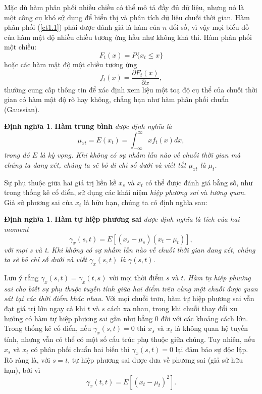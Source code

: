 \documentclass[12pt, a4paper,oneside]{book}
\theoremstyle{definition}
\newtheorem{dn}[theo]{Định nghĩa}
\begin{document}
Mặc dù hàm phân phối nhiều chiều có thể mô tả đầy đủ dữ liệu, nhưng nó là một công cụ khó sử dụng để hiển thị và phân tích dữ liệu chuỗi thời gian. Hàm phân phối (\ref{ct1.1}) phải được đánh giá là hàm của $n$ đối số, vì vậy mọi biểu đồ của hàm mật độ nhiều chiều tương ứng hầu như không khả thi. Hàm phân phối một chiều:
\begin{equation}
{F}_{t}(x)= {P}\{x_{t}\leq x\} \label{ct1.4}
\end{equation}
hoặc các hàm mật độ một chiều tương ứng 
\begin{equation}
{f}_{t}(x)= \dfrac{\partial{F}_{t}(x)}{\partial x}, \label{ct1.5}
\end{equation}
thường cung cấp thông tin để xác định xem liệu một toạ độ cụ thể của chuỗi thời gian có hàm mật độ rõ hay không, chẳng hạn như hàm phân phối chuẩn (Gaussian).
\begin{dn}\cite{8} \textbf{Hàm trung bình} \textit{được định nghĩa là
\begin{equation}
\mu_{xt} = E(x_{t}) =  \int_{-\infty}^{\infty} xf_{t}(x) dx, \label{ct1.6}
\end{equation}
trong đó $E$ là kỳ vọng. Khi không có sự nhầm lẫn nào về chuỗi thời gian mà chúng ta đang xét, chúng ta sẽ bỏ đi chỉ số dưới và viết tắt $\mu_{xt}$ là $\mu_{t}$.}
\end{dn}

Sự phụ thuộc giữa hai giá trị liền kề $x_{s}$ và $x_{t}$ có thể được đánh giá bằng số, như trong thống kê cổ điển, sử dụng các khái niệm \textit{hiệp phương sai} và \textit{tương quan}. Giả sử phương sai của $x_{t}$ là hữu hạn, chúng ta có định nghĩa sau:
\begin{dn}\cite{8} \textbf{Hàm tự hiệp phương sai} \textit{được định nghĩa là tích của hai moment
\begin{equation}
\gamma_{x}(s,t) =E[(x_{s}-\mu_{s})(x_{t}-\mu_{t})], \label{ct1.11}
\end{equation}
với mọi s và t. Khi không có sự nhầm lẫn nào về chuỗi thời gian đang xét, chúng ta sẽ bỏ chỉ số dưới và viết $\gamma_{x}(s,t)$ là $ \gamma(s,t).$}
\end{dn}

Lưu ý rằng $\gamma_{x}(s,t) =\gamma_{x}(t,s)$ với mọi thời điểm $s$ và $t$. \textit{Hàm tự hiệp phương sai cho biết sự phụ thuộc tuyến tính giữa hai điểm trên cùng một chuỗi được quan sát tại các thời điểm khác nhau}. Với mọi chuỗi trơn, hàm tự hiệp phương sai vẫn đạt giá trị lớn ngay cả khi $t$ và $s$ cách xa nhau, trong khi chuỗi thay đổi xu hướng có hàm tự hiệp phương sai  gần như bằng 0 đối với các khoảng cách lớn. Trong thống kê cổ điển, nếu $\gamma_{x} (s,t)= 0$ thì $x_{s}$ và $x_{t}$ là không quan hệ tuyến tính, nhưng vẫn có thể có một số cấu trúc phụ thuộc giữa chúng. Tuy nhiên, nếu $x_{s}$ và $x_{t}$ có phân phối chuẩn hai biến thì $\gamma_{x}(s,t) = 0$ lại đảm bảo sự độc lập. Rõ ràng là, với $s = t$, tự hiệp phương sai được đưa về phương sai (giả sử hữu hạn), bởi vì
\begin{equation}
\gamma_{x}(t,t) = E [(x_{t}- \mu_{t})^2]. \label{ct1.12}
\end{equation}
\end{document}
